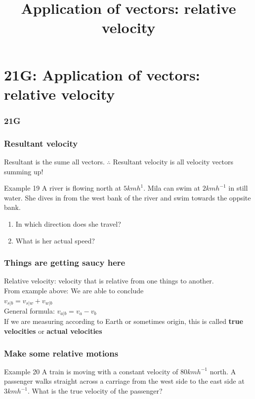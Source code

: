 \documentclass[
	11pt, %
]{beamer}
\newcommand{\blank}{\begin{frame}\end{frame}}
\begin{document}

\section{21G: Application of vectors: relative velocity}
\begin{frame}
    \frametitle{21G}
    \begin{center}
        \title{Application of vectors: relative velocity}
        \maketitle
    \end{center}
\end{frame}

\begin{frame}[t]
    \frametitle{Resultant velocity}
    Resultant is the sume all vectors. $\therefore$ Resultant velocity is all velocity vectors summing up!\\
    \begin{block}{Example 19}
        A river is flowing north at $5kmh^1$. Mila can swim at $2kmh^{-1}$ in still water. She dives in from the west bank of the river 
        and swim towards the oppsite bank.
        \begin{enumerate}
            \item In which direction does she travel?
            \item What is her actual speed?
        \end{enumerate}
    \end{block}
\end{frame}
\blank

\begin{frame}
    \frametitle{Things are getting saucy here}
    Relative velocity: velocity that is relative from one things to another.\\
    From example above: We are able to conclude\\
    $v_{s|b} = v_{s|w} + v_{w|b}$\\
    General formula: $v_{a|b} = v_a - v_b$\\
    If we are measuring according to Earth or sometimes origin, this is called \textbf{true velocities} or \textbf{actual velocities}
\end{frame}

\begin{frame}[t]
    \frametitle{Make some relative motions}
    \begin{block}{Example 20}
        A train is moving with a constant velocity of $80 kmh^{-1}$ north. A passenger walks straight
 across a carriage from the west side to the east side at $3 kmh^{-1}$. What is the true velocity of
 the passenger?
    \end{block}
\end{frame}
\blank
\end{document}
